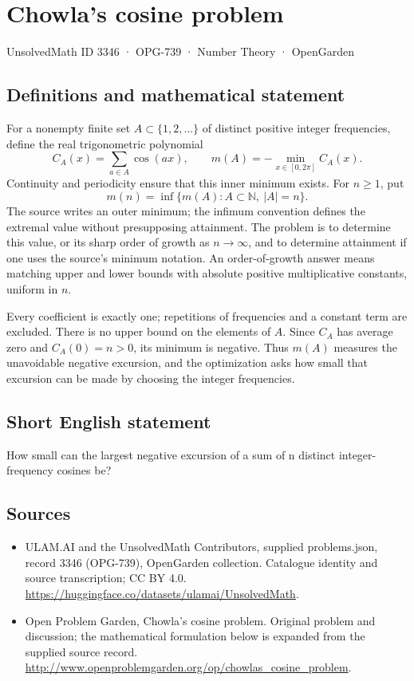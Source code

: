\documentclass[11pt,a4paper]{article}
\begin{document}
\section*{Chowla's cosine problem}\label{3346}
{\small UnsolvedMath ID 3346 · OPG-739 · Number Theory · OpenGarden}
\subsection{Definitions and mathematical statement}
For a nonempty finite set $A\subset\{1,2,\ldots\}$ of distinct positive
integer frequencies, define the real trigonometric polynomial
\[
 C_A(x)=\sum_{a\in A}\cos(ax),\qquad
 m(A)=-\min_{x\in[0,2\pi]}C_A(x).
\]
Continuity and periodicity ensure that this inner minimum exists. For
$n\ge1$, put
\[
 m(n)=\inf\{m(A):A\subset\mathbb N,\ |A|=n\}.
\]
The source writes an outer minimum; the infimum convention defines the
extremal value without presupposing attainment. The problem is to
determine this value, or its sharp order of growth as $n\to\infty$,
and to determine attainment if one uses the source's minimum notation.
An order-of-growth answer means matching upper and lower bounds with
absolute positive multiplicative constants, uniform in $n$.

Every coefficient is exactly one; repetitions of frequencies and a
constant term are excluded. There is no upper bound on the elements of
$A$. Since $C_A$ has average zero and $C_A(0)=n>0$, its minimum is
negative. Thus $m(A)$ measures the unavoidable negative excursion, and
the optimization asks how small that excursion can be made by choosing
the integer frequencies.
\subsection{Short English statement}
How small can the largest negative excursion of a sum of n distinct integer-frequency cosines be?
\subsection{Sources}
\begin{itemize}
\item[S1] ULAM.AI and the UnsolvedMath Contributors, supplied problems.json, record 3346 (OPG-739), OpenGarden collection. Catalogue identity and source transcription; CC BY 4.0.
\url{https://huggingface.co/datasets/ulamai/UnsolvedMath}.
\item[S2] Open Problem Garden, Chowla's cosine problem. Original problem and discussion; the mathematical formulation below is expanded from the supplied source record.
\url{http://www.openproblemgarden.org/op/chowlas_cosine_problem}.
\end{itemize}
\end{document}
